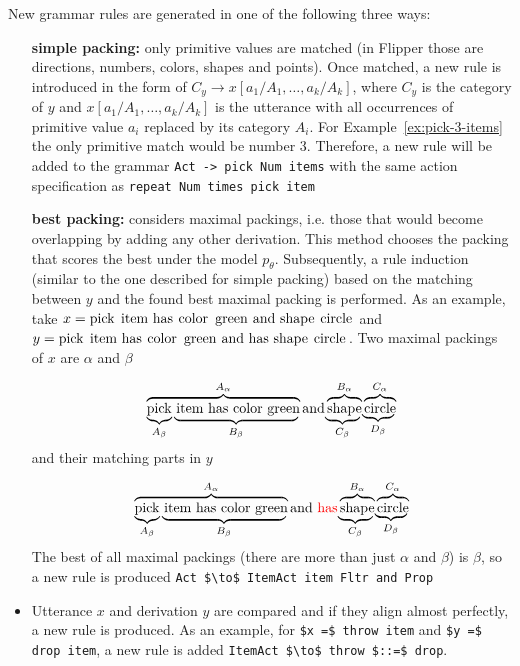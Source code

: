 \documentclass[letterpaper, 10 pt, conference]{ieeeconf}  %
\newcommand{\tool}{Flipper\xspace}
\begin{document}
New grammar rules are generated in one of the following three ways:
\begin{itemize}
 \item[\bf simple packing:] only primitive values are matched (in \tool those
 are directions, numbers, colors, shapes and points). Once matched, a new rule
 is introduced in the form of $C_y \rightarrow x[a_1/A_1,\ldots, a_k/A_k]$,
 where $C_y$ is the category of $y$ and $x[a_1/A_1,\ldots, a_k/A_k]$ is the
 utterance with all occurrences of primitive value $a_i$ replaced by its
 category $A_i$. For Example~\ref{ex:pick-3-items} the only primitive match would be number 3. Therefore, a new rule will be added to the grammar \lstinline{Act -> pick Num items} with the same action specification as \lstinline{repeat Num times pick item}

 \item[\bf best packing:] considers maximal packings, i.e. those that would
 become overlapping by adding any other derivation. This method chooses the
 packing that scores the best under the model $p_\theta$. Subsequently, a rule
 induction (similar to the one described for simple packing) based on the
 matching between $y$ and the found best maximal packing is performed.
 As an example, take $x = \text{\lstinline{pick item has color green and shape circle}}$ and
$y = \text{\lstinline{pick item has color green and has shape circle}}$. Two maximal packings of $x$ are $\alpha$ and $\beta$

 \[
 \ooalign{
 $\overbrace{\text{pick item has color green}}^{A_\alpha}\text{and}\overbrace{\text{shape}}^{B_\alpha}\overbrace{\text{circle}}^{C_\alpha}$\cr
 $\underbrace{\phantom{\text{pick}}}_{A_\beta}\underbrace{\phantom{\text{item has color green}}}_{B_\beta} \phantom{\text{and}} \underbrace{\phantom{\text{shape}}}_{C_\beta}\underbrace{\phantom{\text{circle}}}_{D_\beta}$\cr
 }
 \]
%
 and their matching parts in $y$

 \[
 \ooalign{
 $\overbrace{\text{pick item has color green}}^{A_\alpha}\text{and \textcolor{red}{has}}\overbrace{\text{shape}}^{B_\alpha}\overbrace{\text{circle}}^{C_\alpha}$\cr
 $\underbrace{\phantom{\text{pick}}}_{A_\beta}\underbrace{\phantom{\text{item has color green}}}_{B_\beta} \phantom{\text{and \textcolor{red}{has}}} \underbrace{\phantom{\text{shape}}}_{C_\beta}\underbrace{\phantom{\text{circle}}}_{D_\beta}$\cr
 }
 \]
%
The best of all maximal packings (there are more than just $\alpha$ and $\beta$) is $\beta$, so a new rule is produced
\lstinline{Act $\to$ ItemAct item Fltr and Prop}

 \item[\bf alignment:] Utterance $x$ and derivation $y$ are compared and if they align almost perfectly, a new rule is produced.
As an example, for \lstinline{$x =$ throw item} and \lstinline{$y =$ drop item}, a new rule is added
 \lstinline{ItemAct $\to$ throw $::=$ drop}.
\end{itemize}
\end{document}
